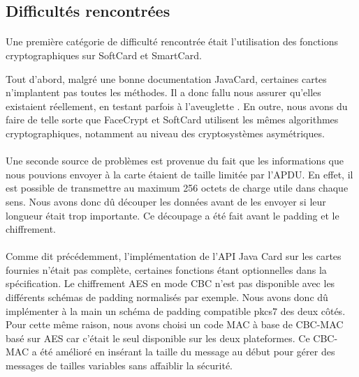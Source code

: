 \documentclass[a4paper,11pt,french]{article}
\begin{document}
\subsection{Difficultés rencontrées}
\paragraph{}
Une première catégorie de difficulté rencontrée était l'utilisation des fonctions
cryptographiques sur SoftCard et SmartCard.

Tout d'abord, malgré une bonne documentation JavaCard, certaines cartes 
n'implantent pas toutes les méthodes. Il a donc fallu nous assurer 
qu'elles existaient réellement, en testant parfois \og à l'aveuglette 
\fg{}. En outre, nous avons du faire de telle sorte que FaceCrypt et SoftCard 
utilisent les mêmes algorithmes cryptographiques, notamment au niveau des 
cryptosystèmes asymétriques.



\paragraph{}
Une seconde source de problèmes est provenue du fait que les informations que nous
pouvions envoyer à la carte étaient de taille limitée par l'APDU. En effet, il 
est possible de transmettre au maximum 256 octets de charge utile dans chaque 
sens. Nous avons donc dû découper les données avant de les envoyer si leur 
longueur était trop importante. Ce découpage a été fait avant le padding et le 
chiffrement.


\paragraph{}
Comme dit précédemment, l'implémentation de l'API Java Card sur les cartes 
fournies n'était pas complète, certaines fonctions étant optionnelles dans la 
spécification. Le chiffrement AES en mode CBC n'est pas disponible avec les différents schémas de padding normalisés par exemple. Nous avons donc dû implémenter 
à la main un schéma de padding compatible pkcs7 des deux côtés.
Pour cette même raison, nous avons choisi un code MAC à base de CBC-MAC basé sur AES car c'était le seul disponible sur les deux plateformes.
Ce CBC-MAC a été amélioré en insérant la taille du message au début pour gérer des messages de tailles variables sans affaiblir la sécurité. 
\end{document}
